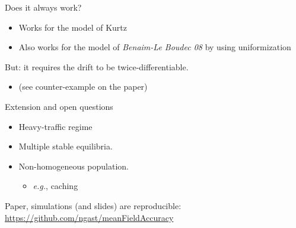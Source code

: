 \documentclass{beamer}
\newcommand\red[1]{{\color{red}#1}}
\begin{document}
\begin{frame}{Does it always work?}
  \begin{itemize}
  \item Works for the model of Kurtz
  \item Also works for the model of \emph{Benaim-Le Boudec 08} by
    using uniformization 
  \end{itemize}

  \bigskip
  But: it requires the drift to be \red{twice-differentiable}. 
  \begin{itemize}
  \item (see counter-example on the paper)
  \end{itemize}
\end{frame}


\begin{frame}{Extension and open questions}
  \begin{itemize}
  \item Heavy-traffic regime 
  \item Multiple stable equilibria. 
  \item Non-homogeneous population. 
    \begin{itemize}
    \item \emph{e.g.}, caching 
    \end{itemize}
  \end{itemize}
  
  \bigskip\bigskip
  
  Paper, simulations (and slides) are \red{reproducible}:
  \url{https://github.com/ngast/meanFieldAccuracy}
\end{frame}

\appendix
\end{document}
